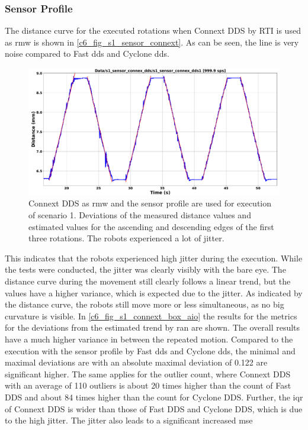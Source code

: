 \subsubsection{Sensor Profile}The distance curve for the executed rotations when Connext DDS by RTI is used as \gls{rmw} is shown in \autoref{c6_fig_s1_sensor_connext}. As can be seen, the line is very noise compared to Fast \gls{dds} and Cyclone \gls{dds}.
\begin{figure}[H]
	\centering
	\includegraphics[width=1\textwidth]{Figures/c6/s1/s1_sensor_connext_dds.pdf}
	\caption{Connext DDS as \gls{rmw} and the sensor profile are used for execution of scenario 1. Deviations of the measured distance values and estimated values for the ascending and descending edges of the first three rotations. The robots experienced a lot of jitter.}
	\label{c6_fig_s1_sensor_connext}
\end{figure}
This indicates that the robots experienced high jitter during the execution. While the tests were conducted, the jitter was clearly visibly with the bare eye. The distance curve during the movement still clearly follows a linear trend, but the values have a higher variance, which is expected due to the jitter. As indicated by the distance curve, the robots still move more or less simultaneous, as no big curvature is visible.\newline
In \autoref{c6_fig_s1_connext_box_aio} the results for the metrics for the deviations from the estimated trend by \gls{ran} are shown. The overall results have a much higher variance in between the repeated motion. Compared to the execution with the sensor profile by Fast \gls{dds} and Cyclone \gls{dds}, the minimal and maximal deviations are with an absolute maximal deviation of 0.122 are significant higher. The same applies for the outlier count, where Connext DDS with an average of 110 outliers is about 20 times higher than the count of Fast DDS and about 84 times higher than the count for Cyclone DDS. Further, the \gls{iqr} of Connext DDS is wider than those of Fast DDS and Cyclone DDS, which is due to the high jitter. The jitter also leads to a significant increased \gls{mse}
